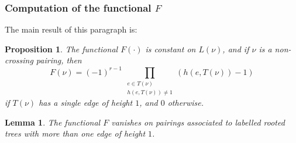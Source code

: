 \documentclass[12pt,a4paper,reqno]{amsart}
\newtheorem{proposition}[theorem]{Proposition}
\newtheorem{lemma}[theorem]{Lemma}
\theoremstyle{remark}
\begin{document}
\subsubsection{Computation of the functional $F$}\label{subsec:functionalF}
The main result of this paragraph is:
\begin{proposition}\label{prop:functionalF}
The functional $F(\cdot)$ is constant on $L(\nu)$, and if $\nu$ is a non-crossing pairing, then
$$F(\nu)=(-1)^{r-1}\,\prod_{\substack{e \in T(\nu)\\h(e,T(\nu))\neq 1}} (h(e,T(\nu))-1)$$
if $T(\nu)$ has a single edge of height $1$, and $0$ otherwise.
\end{proposition}

\begin{lemma}
The functional $F$ vanishes on pairings associated to labelled rooted trees with more than one edge of height $1$.    
\end{lemma}
\end{document}
